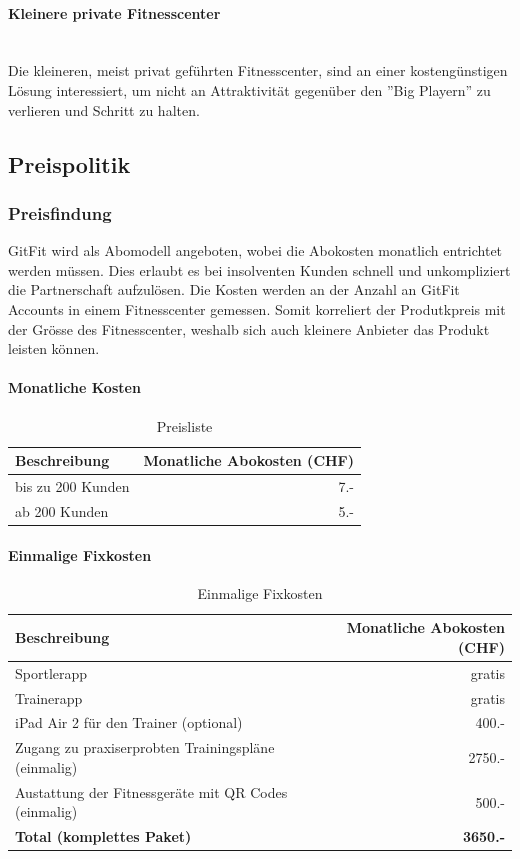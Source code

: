 \paragraph{Kleinere private Fitnesscenter} \hfill \\
Die kleineren, meist privat geführten Fitnesscenter, sind an einer kostengünstigen Lösung interessiert, um nicht an Attraktivität gegenüber den ''Big Playern'' zu verlieren und Schritt zu halten. 


\subsection{Preispolitik}\label{sec:preispolitik}
\subsubsection{Preisfindung}
GitFit wird als Abomodell angeboten, wobei die Abokosten monatlich entrichtet werden müssen. Dies erlaubt es bei insolventen Kunden schnell und unkompliziert die Partnerschaft aufzulösen. Die Kosten werden an der Anzahl an GitFit Accounts in einem Fitnesscenter gemessen. Somit korreliert der Produtkpreis mit der Grösse des Fitnesscenter, weshalb sich auch kleinere Anbieter das Produkt leisten können.

\paragraph{Monatliche Kosten} \hfill
\begin{table}[h]
	\centering
	\begin{tabu} to \linewidth {l r}
		\toprule 
		Beschreibung & Monatliche Abokosten (CHF) \\
		\midrule
		bis zu 200 Kunden & 7.- \\
		ab 200 Kunden & 5.- \\
		\bottomrule 
	\end{tabu} 
	\caption{Preisliste}
\end{table}

\paragraph{Einmalige Fixkosten} \hfill
\begin{table}[h]
	\centering
	\begin{tabu} to \linewidth {l r}
		\toprule 
		Beschreibung & Monatliche Abokosten (CHF) \\
		\midrule
		Sportlerapp & gratis \\
		Trainerapp & gratis \\
		iPad Air 2 für den Trainer (optional) & 400.- \\
		Zugang zu praxiserprobten Trainingspläne (einmalig) & 2750.- \\
		Austattung der Fitnessgeräte mit QR Codes (einmalig) & 500.-  \\
		\midrule
		\textbf{Total (komplettes Paket)} & \textbf{3650.-} \\
		\bottomrule 
	\end{tabu} 
	\caption{Einmalige Fixkosten}
\end{table}

